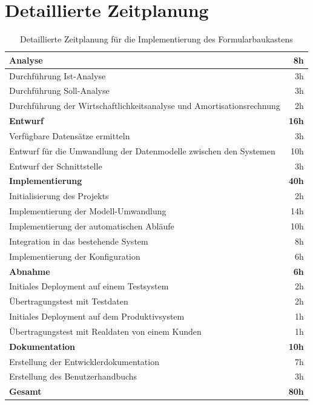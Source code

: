 \documentclass[a4paper,11pt]{article}
\begin{document}
\section{Detaillierte Zeitplanung}
\begin{table}[h]
\centering
\begin{tabular}{|l|r|}
\hline
\textbf{Analyse} & \textbf{8h} \\
\hline
Durchführung Ist-Analyse & 3h \\
\hline
Durchführung Soll-Analyse & 3h \\
\hline
Durchführung der Wirtschaftlichkeitsanalyse und Amortisationsrechnung & 2h \\
\hline
\textbf{Entwurf} & \textbf{16h} \\
\hline
Verfügbare Datensätze ermitteln & 3h \\
\hline
Entwurf für die Umwandlung der Datenmodelle zwischen den Systemen & 10h \\
\hline
Entwurf der Schnittstelle & 3h \\
\hline
\textbf{Implementierung} & \textbf{40h} \\
\hline
Initialisierung des Projekts & 2h \\
\hline
Implementierung der Modell-Umwandlung & 14h \\
\hline
Implementierung der automatischen Abläufe & 10h \\
\hline
Integration in das bestehende System & 8h \\
\hline
Implementierung der Konfiguration & 6h \\
\hline
\textbf{Abnahme} & \textbf{6h} \\
\hline
Initiales Deployment auf einem Testsystem & 2h \\
\hline
Übertragungstest mit Testdaten & 2h \\
\hline
Initiales Deployment auf dem Produktivsystem & 1h \\
\hline
Übertragungstest mit Realdaten von einem Kunden & 1h \\
\hline
\textbf{Dokumentation} & \textbf{10h} \\
\hline
Erstellung der Entwicklerdokumentation & 7h \\
\hline
Erstellung des Benutzerhandbuchs & 3h \\
\hline
\textbf{Gesamt} & \textbf{80h} \\
\hline
\end{tabular}
\caption{Detaillierte Zeitplanung für die Implementierung des Formularbaukastens}
\end{table}
\end{document}

